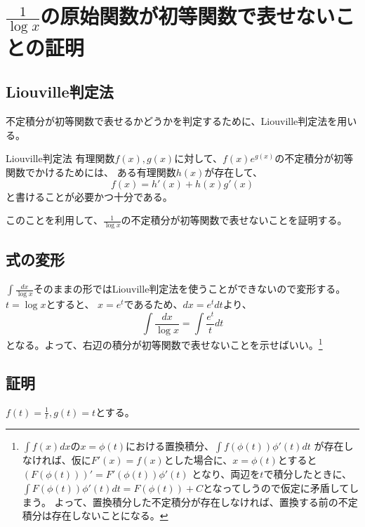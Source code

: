 \documentclass[a4j,dvipdfmx]{jsarticle}
\begin{document}
\section*{$\frac{1}{\log x}$の原始関数が初等関数で表せないことの証明}
\subsection{Liouville判定法}
不定積分が初等関数で表せるかどうかを判定するために、Liouville判定法を用いる。
\begin{itembox}[c]{Liouville判定法}
    有理関数$f(x),g(x)$に対して、$\displaystyle f(x)e^{g(x)}$の不定積分が初等関数でかけるためには、
    ある有理関数$h(x)$が存在して、
    \begin{equation*}
        f(x)=h'(x)+h(x)g'(x)
    \end{equation*}
    と書けることが必要かつ十分である。
\end{itembox}
このことを利用して、$\frac{1}{\log x}$の不定積分が初等関数で表せないことを証明する。
\subsection{式の変形}
$\displaystyle \int \frac{dx}{\log x}$そのままの形ではLiouville判定法を使うことができないので変形する。$t=\log x$とすると、
$x=e^t$であるため、$\displaystyle dx=e^tdt$より、
\begin{equation*}
    \int \frac{dx}{\log x}=\int \frac{e^t}{t}dt
\end{equation*}
となる。よって、右辺の積分が初等関数で表せないことを示せばいい。\footnote{
    $\int f(x)dx$の$x=\phi(t)$における置換積分、$\int f(\phi(t))\phi'(t)dt$
    が存在しなければ、仮に$F'(x)=f(x)$とした場合に、$x=\phi(t)$とすると$(F(\phi(t)))'=F'(\phi(t))\phi'(t)$
    となり、両辺を$t$で積分したときに、$\int F(\phi(t))\phi'(t)dt=F(\phi(t))+C$となってしうので仮定に矛盾してしまう。
    よって、置換積分した不定積分が存在しなければ、置換する前の不定積分は存在しないことになる。
}
\subsection{証明}
$f(t)=\frac{1}{t},g(t)=t$とする。
\end{document}
